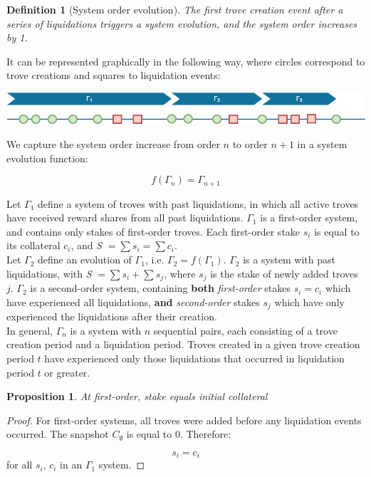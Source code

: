 \documentclass[reqno]{article}
\newtheorem{definition}{Definition}[section]
\newtheorem{proposition}[theorem]{Proposition}
\begin{document}
\begin{definition}[System order evolution]
  The first trove creation event after a series of liquidations triggers a system evolution, and the system order increases by 1.
\end{definition}

It can be represented graphically in the following way, where circles correspond to trove creations and squares to liquidation events:

\includegraphics[width=\linewidth]{System_order_evolution_generic.png}

We capture the system order increase from order $n$ to order $n+1$  in a system evolution function:

\begin{equation} 
    f(\Gamma_n)=\Gamma_{n+1}
\end{equation}

\bigskip
Let $\Gamma_1$ define a system of troves with past liquidations, in which all active troves have received reward shares from all past liquidations. $\Gamma_1$ is a first-order system, and contains only stakes of first-order troves. Each first-order stake $s_i$ is equal to its collateral $c_i$, and \textit{S} $= \sum s_i = \sum c_i$.\\

Let $\Gamma_2$ define an evolution of $\Gamma_1$, i.e. $\Gamma_2 = f(\Gamma_1)$. $\Gamma_2$ is a system with past liquidations, with \textit{S} $= \sum s_i + \sum s_j$, where $s_j$ is the stake of newly added troves $j$. $\Gamma_2$ is a second-order system, containing \textbf{both} \textit{first-order} stakes $s_i = c_i$ which have experienced all liquidations, \textbf{and} \textit{second-order} stakes $s_j$ which have only experienced the liquidations after their creation.\\

In general, $\Gamma_n$ is a system with $n$ sequential pairs, each consisting of a trove creation period and a liquidation period. Troves created in a given trove creation period $t$ have experienced only those liquidations that occurred in liquidation period $t$ or greater.

\begin{proposition}
  At first-order, stake equals initial collateral
\end{proposition}
\begin{proof}
For first-order systems, all troves were added before any liquidation events occurred. The snapshot $C_\emptyset$ is equal to 0. Therefore:

\begin{equation}
    s_i=c_i
\end{equation}
for all $s_i$, $c_i$ in an $\Gamma_1$ system.
\end{proof}
\end{document}
